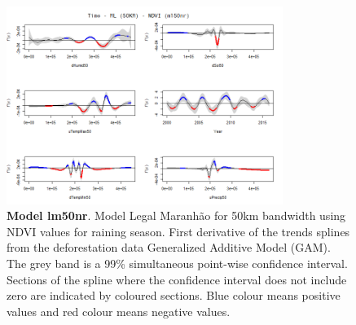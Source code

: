 \begin{table}

\begin{figure}[H]
 \centering
        \centering
        \includegraphics[width=0.8\textwidth]{ml50nr.png} %
        \caption[Model Legal Maranhão for 50km bandwidth using NDVI values for raining season. First derivative of the trends splines from the deforestation data Generalized Additive Model (GAM)]{\textbf{Model lm50nr}. Model Legal Maranhão for 50km bandwidth using NDVI values for raining season. First derivative of the trends splines from the deforestation data Generalized Additive Model (GAM). The grey band is a 99\% simultaneous point-wise confidence interval. Sections of the spline where the confidence interval does not include zero are indicated by coloured sections. Blue colour means positive values and red colour means negative values.}
        \centering
\end{figure}
\end{table}

